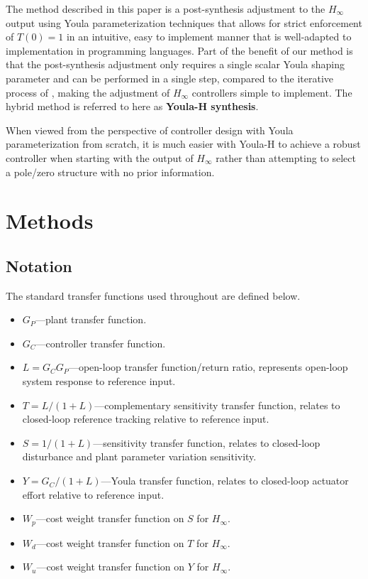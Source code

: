 \documentclass[journal,article,submit,pdftex,moreauthors]{Definitions/mdpi}
\begin{document}
The method described in this paper is a post-synthesis adjustment to the $H_\infty$ output using Youla parameterization techniques that allows for strict enforcement of $T(0)=1$ in an intuitive, easy to implement manner that is well-adapted to implementation in programming languages. Part of the benefit of our method is that the post-synthesis adjustment only requires a single scalar Youla shaping parameter and can be performed in a single step, compared to the iterative process of \citep{hu2025YK}, making the adjustment of $H_\infty$ controllers simple to implement. The hybrid method is referred to here as \textbf{Youla-H synthesis}.

When viewed from the perspective of controller design with Youla parameterization from scratch, it is much easier with Youla-H to achieve a robust controller when starting with the output of $H_\infty$ rather than attempting to select a pole/zero structure with no prior information.

\section{Methods}
\label{sec:methods}
\subsection{Notation}
The standard transfer functions \citep{assadian2022robust} used throughout are defined below.

\begin{itemize}
\item \(G_P\)---plant transfer function.
\item \(G_C\)---controller transfer function.
\item \(L=G_CG_P\)---open-loop transfer function/return ratio, represents open-loop system response to reference input.
\item \(T=L/(1+L)\)---complementary sensitivity transfer function, relates to closed-loop reference tracking relative to reference input.
\item \(S=1/(1+L)\)---sensitivity transfer function, relates to closed-loop disturbance and plant parameter variation sensitivity.
\item \(Y=G_C/(1+L)\)---Youla transfer function, relates to closed-loop actuator effort relative to reference input.
\item $W_p$---cost weight transfer function on $S$ for $H_\infty$.
\item $W_d$---cost weight transfer function on $T$ for $H_\infty$.
\item $W_u$---cost weight transfer function on $Y$ for $H_\infty$.
\end{itemize}
\end{document}
